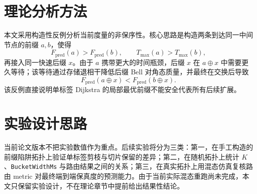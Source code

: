 \section{理论分析方法}

本文采用构造性反例分析当前度量的非保序性。核心思路是构造两条到达同一中间节点的前缀 $a,b$，使得
\[
F_{\mathrm{pred}}(a)>F_{\mathrm{pred}}(b),
\qquad
T_{\max}(a)>T_{\max}(b),
\]
再接入同一快速后缀 $x$。由于 $a$ 携带更大的时间瓶颈，后缀 $x$ 在 $a\oplus x$ 中需要更久等待；该等待通过存储退相干降低后缀 Bell 对角态质量，并最终在交换后导致
\[
F_{\mathrm{pred}}(a\oplus x)
<
F_{\mathrm{pred}}(b\oplus x).
\]
该反例直接说明单标签 Dijkstra 的局部最优前缀不能安全代表所有后续扩展。

\section{实验设计思路}

当前论文版本不把实验数值作为重点。后续实验将分为三类：第一，在手工构造的前缀陷阱拓扑上验证单标签剪枝与切片保留的差异；第二，在随机拓扑上统计 $K$、\texttt{BucketWidthMs} 与路由结果之间的关系；第三，在真实拓扑上用混态仿真复核路由 metric 对最终端到端保真度的预测能力。由于当前实际混态重跑尚未完成，本文只保留实验设计，不在理论章节中提前给出结果性结论。
